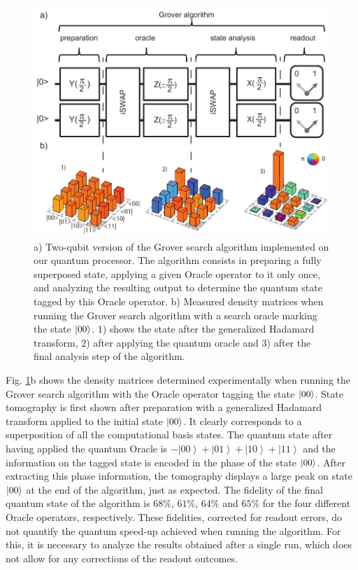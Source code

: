 %
\begin{figure}[ht!]
\centering \includegraphics[width=1\textwidth]{material/figures/2-qubit-processor/grover/grover_schematic_and_density_matrices}
\caption[Schematic of the Grover search algorithm and measured density matrices when running it]{a) Two-qubit version of the Grover search algorithm  implemented on our quantum processor. The algorithm consists in preparing a fully superposed
state, applying a given Oracle operator to it only
once, and analyzing the resulting output to determine the quantum
state tagged by this Oracle operator. b) Measured density matrices when running the Grover search algorithm
with a search oracle marking the state $\left| 00 \right>$. 1) shows the state
after the generalized Hadamard transform, 2) after applying the quantum
oracle and 3) after the final analysis step of the algorithm.}


\label{fig:grover_algorithm_schematic_and_density_matrices} %
\end{figure}


Fig. \ref{fig:grover_algorithm_schematic_and_density_matrices}b
shows the density matrices determined experimentally when running
the Grover search algorithm with the Oracle operator tagging the
state $\left| 00 \right>$. State tomography is first shown after preparation
with a generalized Hadamard transform applied to the initial state
$\left| 00 \right>$. It clearly corresponds to a superposition of all
the computational basis states. The quantum state after having applied the quantum
Oracle is $-\left|00\right\rangle +\left|01\right\rangle +\left|10\right\rangle +\left|11\right\rangle $
and the information on the tagged state is encoded in the phase of the state $\left| 00 \right>$. After extracting this phase information, the tomography displays a large peak on state $\left| 00 \right>$ at the end of the algorithm, just as expected. The fidelity of the final quantum state of the algorithm
is $68\%$, $61\%$, $64\%$ and $65\%$ for the four different Oracle
operators, respectively. These fidelities, corrected for readout errors,
do not quantify the quantum speed-up achieved when running the algorithm. For this, it is necessary to analyze the results obtained
after a single run, which does not allow for any corrections of the
readout outcomes.


